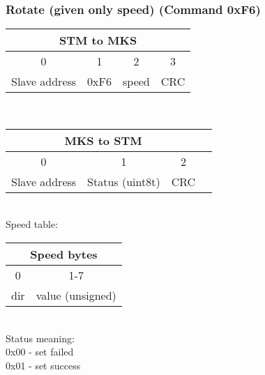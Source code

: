 \documentclass[]{article}
\begin{document}
	\subsubsection*{Rotate (given only speed) (Command 0xF6)}
	\begin{tabular}{|c|c|c|c|}
		\hline
		\multicolumn{4}{|c|}{STM to MKS} \\ \hline
		0 & 1 & 2 & 3\\ \hline
		Slave address & 0xF6 & speed & CRC \\ \hline		
	\end{tabular}\\ 	
	\begin{tabular}{|c|c|c|c|}
		\hline
		\multicolumn{3}{|c|}{MKS to STM} \\ \hline
		0 & 1 & 2  \\ \hline
		Slave address & Status (uint8t) & CRC \\ \hline
	\end{tabular}\\
	Speed table:\\
	\begin{tabular}{|c|c|}
	\hline
	\multicolumn{2}{|c|}{Speed bytes} \\ \hline
	0 & 1-7 \\ \hline
	dir & value (unsigned) \\ \hline
	\end{tabular}\\
	Status meaning:\\
	0x00 - set failed \\
	0x01 - set success \\
\end{document}
